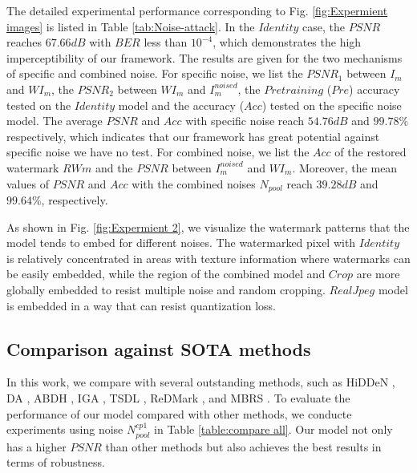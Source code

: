 \documentclass[sigconf]{acmart}
\begin{document}
The detailed experimental performance corresponding to Fig. \ref{fig:Expermient images} is listed in Table \ref{tab:Noise-attack}. In the $Identity$ case, the $PSNR$ reaches $67.66 dB$ with $BER$ less than $10^{-4}$, which demonstrates the high imperceptibility of our framework. 
The results are given for the two mechanisms of specific and combined noise. For specific noise, we list the $PSNR_{1}$ between $I_{m}$ and $WI_{m}$, the $PSNR_{2}$ between $WI_{m}$ and $I_{m}^{noised}$, the $Pretraining$ ($Pre$) accuracy tested on the $Identity$ model and the accuracy ($Acc$) tested on the specific noise model. The average $PSNR$ and $Acc$ with specific noise reach $54.76 dB$ and $99.78\%$ respectively, which indicates that our framework has great potential against specific noise we have no test. For combined noise, we list the $Acc$ of the restored watermark $RWm$ and the $PSNR$ between $I_{m}^{noised}$ and $WI_{m}$. Moreover, the mean values of $PSNR$ and $Acc$ with the combined noises $N_{pool}$ reach $39.28 dB$ and $99.64\%$, respectively.



As shown in Fig. \ref{fig:Expermient 2}, we visualize the watermark patterns that the model tends to embed for different noises. The watermarked pixel with $Identity$ is relatively concentrated in areas with texture information where watermarks can be easily embedded, while the region of the combined model and $Crop$ are more globally embedded to resist multiple noise and random cropping. $RealJpeg$ model is embedded in a way that can resist quantization loss.







\subsection{Comparison against SOTA methods}

In this work, we compare with several outstanding methods, such as HiDDeN \cite{zhu2018hidden}, DA \cite{luo2020distortion}, ABDH \cite{yu2020attention}, IGA \cite{zhang2020robust}, TSDL \cite{liu2019novel}, ReDMark \cite{ahmadi2020redmark}, and MBRS \cite{jia2021mbrs}. To evaluate the performance of our model compared with other methods, we conducte experiments using noise $N^{cp1}_{pool}$ in Table \ref{table:compare all}.
Our model not only has a higher $PSNR$ than other methods but also achieves the best results in terms of robustness.
\end{document}

